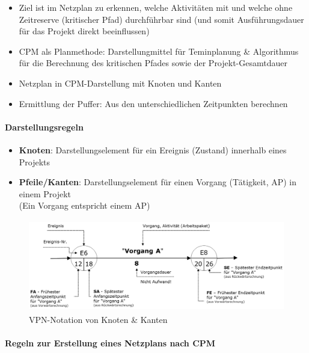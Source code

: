 \documentclass[a4paper]{article}
\begin{document}
			\begin{itemize}
				\item Ziel ist im Netzplan zu erkennen, welche Aktivitäten mit und welche ohne Zeitreserve (kritischer Pfad) durchführbar sind (und somit Ausführungsdauer für das Projekt direkt beeinflussen)
				\item CPM als Planmethode: Darstellungmittel für Teminplanung \& Algorithmus für die Berechnung des kritischen Pfades sowie der Projekt-Gesamtdauer
				\item Netzplan in CPM-Darstellung mit Knoten und Kanten
				\item Ermittlung der Puffer: Aus den unterschiedlichen Zeitpunkten berechnen
			\end{itemize}
		
\newpage
		
			\paragraph{Darstellungsregeln}
			
			\begin{itemize}
				\item \textbf{Knoten}: Darstellungselement für ein Ereignis (Zustand) innerhalb eines Projekts
				\item \textbf{Pfeile/Kanten}: Darstellungselement für einen Vorgang (Tätigkeit, AP) in einem Projekt\\
				(Ein Vorgang entspricht einem AP)
			\end{itemize}
		
			\begin{figure}[!htb]
				\centering
				\includegraphics[height=4cm]{img/pm/vpn_notation.png}
				\caption{VPN-Notation von Knoten \& Kanten}
			\end{figure}
		
			\paragraph{Regeln zur Erstellung eines Netzplans nach CPM}
			
\end{document}
